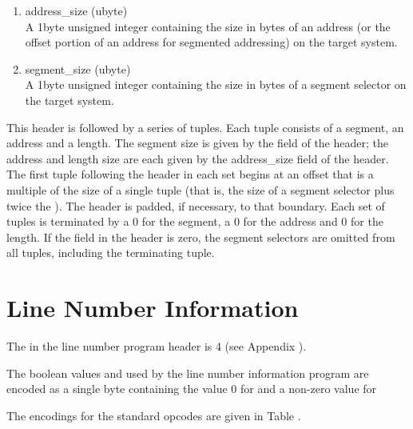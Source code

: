 \begin{enumerate}[1. ]
\item address\_size (ubyte) \\
A 1\dash byte unsigned integer containing the size in bytes of an
address 
(or the offset portion of an address for segmented
addressing) on the target system.

\item segment\_size (ubyte) \\
A 
1\dash byte unsigned integer containing the size in bytes of a
segment selector on the target system.

\end{enumerate}

This header is followed by a series of tuples. Each tuple
consists of a segment, an address and a length. 
The segment
size is given by the  field of the header; the
address and length size are each given by the address\_size
field of the header. 
The first tuple following the header in
each set begins at an offset that is a multiple of the size
of a single tuple (that is, the size of a segment selector
plus twice the ). 
The header is padded, if
necessary, to that boundary. Each set of tuples is terminated
by a 0 for the segment, a 0 for the address and 0 for the
length. If the  field in the header is zero,
the segment selectors are omitted from all tuples, including
the terminating tuple.


\section{Line Number Information}
\label{datarep:linenumberinformation}

The 
in the line number program header is 4
(see Appendix ). 

The boolean values  and  
used by the line number information program are encoded
as a single byte containing the value 0 
for  and a non-zero value for 

The encodings for the standard opcodes are given in 
Table .

